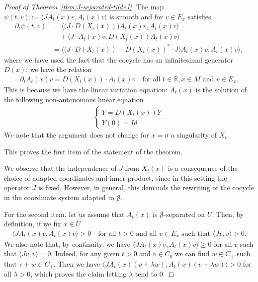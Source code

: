 \documentclass[12pt,reqno]{amsart}
\numberwithin{equation}{section}
\theoremstyle{plain}
\theoremstyle{definition}
\newcommand{\RR}{{\mathbb R}}
\newcommand{\J}{\EuScript{J}}
\begin{document}
\begin{proof}[Proof of Theorem~\ref{thm:J-separated-tildeJ}]
The map $\psi(t,v):=\langle J A_t(x) v,A_t(x) v\rangle$ is
smooth and for $v\in E_x$ satisfies
 \begin{align*}
  \partial_t\psi(t,v) &= \langle \big(J\cdot
  D(X_t(x))\big)A_t(x) v, A_t(x) v \rangle
  \\
  &\quad + \langle J\cdot A_t(x) v , D(X_t(x)) A_t(x) v \rangle
  \\
  &= \langle \big(J\cdot D(X_t(x)) + D(X_t(x))^* \cdot J
  \big)A_t(x) v, A_t(x) v \rangle,
\end{align*}
where we have used the fact that the cocycle has an
infinitesimal generator $D(x)$: we have the relation
\begin{align}\label{eq:linear-variational}
  \partial_t A_t(x) v = D(X_t(x))\cdot A_t(x) v
  \quad\text{for all
  $t\in\RR, x\in M$ and $v\in E_x$.}
\end{align}
This is because we have
the linear variation equation: $A_t(x)$ is the solution of
the following non-autonomous linear equation
\begin{align}\label{eq:non-homo-ode}
  \begin{cases}
    \dot{Y}=D(X_t(x))Y\\
    Y(0)=Id
  \end{cases}.
\end{align}
We note that the argument does not change for $x=\sigma$ a singularity of $X_t$.

This proves the first item of the statement of the theorem.

We observe that the independence of $J$ from $X_t(x)$ is a
consequence of the choice of adapted coordinates and inner
product, since in this setting the operator $J$ is
fixed. However, in general, this demands the rewriting of
the cocycle in the coordinate system adapted to $\J$.

For the second item, let us assume that $A_t(x)$ is
$\J$-separated on $U$. Then, by definition, if we fix $x\in
U$
\begin{align}\label{eq:def-J-separated}
  \langle J A_t(x) v,A_t(x) v\rangle > 0 \quad \text{for all
    $t>0$ and all $v\in E_x$ such that $\langle
    Jv,v\rangle>0$}.
\end{align}
We also note that, by continuity, we have $\langle J A_t(x)
v,A_t(x) v\rangle \ge 0$ for all $v$ such that $\langle
Jv,v\rangle=0$. Indeed, for any given $t>0$ and $v\in C_0$
we can find $w\in C_+$ such that $v+w\in C_+$. Then we have
$\langle J A_t(x) (v+\lambda w),A_t(x) (v+\lambda w)\rangle
> 0$ for all $\lambda>0$, which proves the claim letting
$\lambda$ tend to $0$.


\end{proof}
\end{document}

